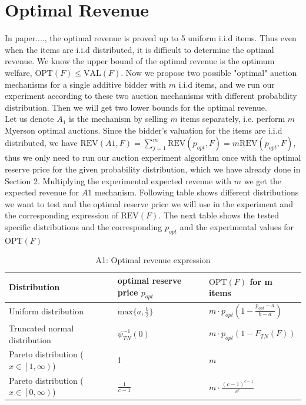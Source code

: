 \section{Optimal Revenue} \label{sec:multiOR}
In paper...., the optimal revenue is proved up to 5 uniform i.i.d items. Thus even when the items are i.i.d distributed, it is difficult to determine the optimal revenue. We know the upper bound of the optimal revenue is the optimum welfare, $\text{OPT}(F) \leqslant \text{VAL}(F)$. Now we propose two possible "optimal" auction mechanisms for a single additive bidder with $m$ i.i.d items, and we run our experiment according to these two auction mechanisms with different probability distribution. Then we will get two lower bounds for the optimal revenue.\\
Let us denote $A_1$ is the mechanism by selling $m$ items separately, i.e. perform $m$ Myerson optimal auctions. Since the bidder's valuation for the items are i.i.d distributed, we have $\text{REV}(A1, F) = \sum^m_{j=1} \text{REV}(p_{opt}, F) = m\text{REV}(p_{opt}, F)$, thus we only need to run our auction experiment algorithm once with the optimal reserve price for the given probability distribution, which we have already done in Section 2. Multiplying the experimental expected revenue with $m$ we get the expected revenue for $A1$ mechanism. Following table shows different distributions we want to test and the optimal reserve price we will use in the experiment and the corresponding expression of $\text{REV}(F)$. The next table shows the tested specific distributions and the corresponding $p_{opt}$ and the experimental values for $\text{OPT}(F)$
\begin{center}
	\begin{table}[H]
		\begin{tabular}{ | m{5cm} | m{4cm} |m{4cm}|  } 
		\hline
		\textbf{Distribution}	&	\textbf{optimal reserve price $p_{opt}$}  & 	\textbf{$\text{OPT}(F)$ for m items}   \\ 
		\hline
		Uniform distribution & $\text{max} \{a, \frac{b}{2} \}$ & $m \cdot p_{opt} (1-\frac {p_{opt}-a}{b-a})$  \\ 
		\hline
		Truncated normal distribution & $ \psi_{TN}^{-1}(0)$ & $ m \cdot p_{opt} (1-F_{TN}(F))$ \\ 
		\hline
		 Pareto distribution  ($x \in \left[1,\infty \right)$)& 1 & $m$ \\
		\hline
		 Pareto distribution  ($x \in \left[0,\infty \right)$)& $\frac{1}{c-1}$ & $m \cdot \frac{(c-1)^{c-1}}{c^c}$ \\
		\hline
		\end{tabular}
		\caption{A1: Optimal revenue expression}
		\label{tab:optrevenueExpression}
	\end{table}
\end{center}

